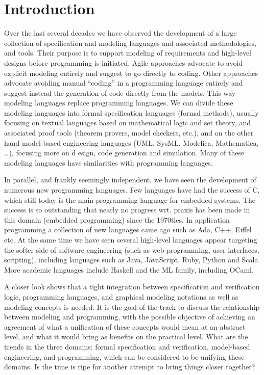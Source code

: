 
\section{Introduction}
\label{sec:introduction}

Over the last several decades we have observed the development of 
a large collection of specification and modeling languages and 
associated methodologies, and tools. Their purpose is to 
support modeling of requirements and high-level designs before 
programming is initiated. Agile approaches advocate to avoid 
explicit modeling entirely and suggest to go directly to coding. 
Other approaches advocate avoiding manual “coding” in a 
programming 
language entirely and suggest instead the generation of code 
directly from the models. This way modeling languages replace 
programming languages.  We can divide these modeling languages 
into formal specification languages (formal methods), usually 
focusing on textual languages based on mathematical logic and set 
theory, and associated proof tools (theorem provers, model 
checkers, etc.), and on the other hand model-based engineering 
languages (UML, SysML, Modelica, Mathematica, …), focusing more on 
d esign, code generation and simulation. Many of these modeling 
languages have similarities with programming languages.

In parallel, and frankly seemingly independent, we have seen the 
development of numerous new programming languages. Few languages 
have had the success of C, which still today is the main 
programming language for embedded systems. The success is so 
outstanding that nearly no progress wrt. praxis has been made in 
this domain (embedded programming) since the 1970ties.  In 
application programming a collection of new languages came ago 
such as Ada, C++, Eiffel etc. At the same time we have seen 
several high-level languages appear targeting the softer side of 
software engineering (such as web-programming, user interfaces, 
scripting), including languages such as Java, JavaScript, Ruby, 
Python and Scala.  More academic languages include Haskell and the 
ML family, including OCaml.

A closer look shows that a tight integration between specification and verification logic, programming languages, and graphical modeling notations as well as modeling concepts is needed. It is the goal of the track to discuss the relationship between modeling and programming, with the possible objective of achieving an agreement of what a unification of these concepts would mean at an abstract level, and what it would bring as benefits on the practical level. What are the trends in the three domains:  
formal specification and verification, 
model-based engineering, and programming, which can be considered to be unifying these domains. Is the time is ripe for another attempt to bring things closer together?

